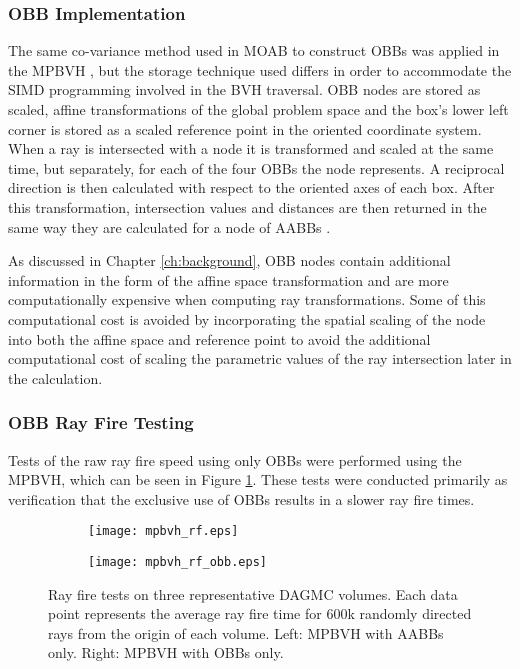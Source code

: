 \subsubsection{OBB Implementation}

The same co-variance method used in MOAB to construct OBBs was applied in the
MPBVH \cite{Weghorst_1984}, but the storage technique used differs in order to
accommodate the SIMD programming involved in the BVH traversal. OBB nodes are
stored as scaled, affine transformations of the global problem space and the
box's lower left corner is stored as a scaled reference point in the oriented
coordinate system. When a ray is intersected with a node it is transformed and
scaled at the same time, but separately, for each of the four OBBs the node
represents. A reciprocal direction is then calculated with respect to the
oriented axes of each box. After this transformation, intersection values and
distances are then returned in the same way they are calculated for a node of
AABBs \cite{Wald_2014}.

As discussed in Chapter \ref{ch:background}, OBB nodes contain additional
information in the form of the affine space transformation and are more
computationally expensive when computing ray transformations. Some of this
computational cost is avoided by incorporating the spatial scaling of the node
into both the affine space and reference point to avoid the additional
computational cost of scaling the parametric values of the ray intersection
later in the calculation.

\subsubsection{OBB Ray Fire Testing}

Tests of the raw ray fire speed using only OBBs were performed using the
MPBVH, which can be seen in Figure
\ref{fig:rf_test_results_obbs}. These tests were conducted primarily as
verification that the exclusive use of OBBs results in a slower ray fire times. 

\begin{figure}[H]
  
  \begin{subfigure}{0.5\textwidth}
    \texttt{[image: mpbvh\_rf.eps]}
  \end{subfigure}%
  \hfill
  \begin{subfigure}{0.5\textwidth}
    \texttt{[image: mpbvh\_rf\_obb.eps]}
  \end{subfigure}
  
  \caption[Ray fire timings for the MPBVH with oriented bounding boxes.]{Ray
    fire tests on three representative DAGMC volumes. Each data point represents
    the average ray fire time for 600k randomly directed rays from the origin of
    each volume. Left: MPBVH with AABBs only. Right: MPBVH with OBBs only.}
  \label{fig:rf_test_results_obbs}
\end{figure}

